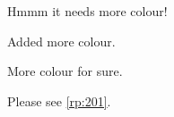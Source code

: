 \reviewersection

\begin{point}
    \label{pt:201}
    Hmmm it needs more colour!
\end{point}

\begin{reply}
    \label{rp:201}
    Added more colour.
\end{reply}

\begin{point}
    \label{pt:202}
    More colour for sure.
\end{point}

\begin{reply}
    \label{rp:202}
    Please see \autoref{rp:201}.
\end{reply}

